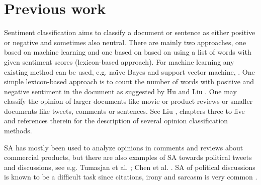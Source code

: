 \documentclass[11pt]{article}
\begin{document}


\section{Previous work}

Sentiment classification aims to classify a document or sentence as either positive or negative and sometimes also neutral. There are mainly two approaches, one based on machine learning and one based on based on using a list of words with given sentiment scores (lexicon-based approach). For machine learning any existing method can be used, e.g. na\"{\i}ve Bayes and support vector machine, \cite{Joachims99,Shawe00}. One simple lexicon-based approach is to count the number of words with positive and negative sentiment in the document as suggested by Hu and Liu . One may classify the opinion of larger documents like movie or product reviews or smaller documents like tweets, comments or sentences. See Liu , chapters three to five and references therein for the description of several opinion classification methods. 

SA has mostly been used to analyze opinions in comments and reviews about commercial products, but there are also examples of SA towards political tweets and discussions, see e.g. Tumasjan et al. ; Chen et al. . SA of political discussions is known to be a difficult task since citations, irony and sarcasm is very common \cite{Bing12}.
\end{document}
